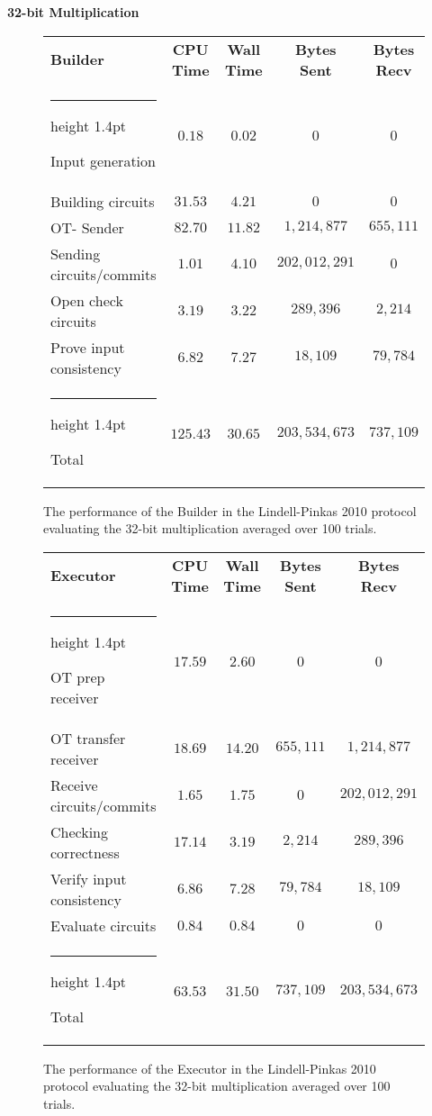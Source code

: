 \documentclass[11pt]{article} %
\makeatletter
\newcommand{\thickhline}{%
    \noalign {\ifnum 0=`}\fi \hrule height 1.4pt
    \futurelet \reserved@a \@xhline
}
\makeatother
\begin{document}
				\FloatBarrier
				\noindent \textbf{32-bit Multiplication}
				\begin{figure}[!ht]
					\begin{tabular}{| p{4.3cm} | c c c c |}
						\hline
						\textbf{Builder} & \textbf{CPU Time} & \textbf{Wall Time} & \textbf{Bytes Sent} & \textbf{Bytes Recv} \\
						\thickhline
						Input generation & $0.18$ & $0.02$ & $0$ & $0$ \\
						\hline
						Building circuits & $31.53$ & $4.21$ & $0$ & $0$ \\
						\hline
						OT- Sender & $82.70$ & $11.82$ & $1,214,877$ & $655,111$ \\
						\hline
						Sending circuits/commits & $1.01$ & $4.10$ & $202,012,291$ & $0$ \\
						\hline
						Open check circuits & $3.19$ & $3.22$ & $289,396$ & $2,214$ \\
						\hline
						Prove input consistency & $6.82$ & $7.27$ & $18,109$ & $79,784$ \\
						\thickhline
						Total & $125.43$ & $30.65$ & $203,534,673$ & $737,109$ \\
						\hline
					\end{tabular}

					\caption{The performance of the Builder in the Lindell-Pinkas 2010 protocol evaluating the 32-bit multiplication averaged over 100 trials. \label{table:LP_2010_Mul_Builder}}
				\end{figure}
				
				\begin{figure}[!ht]
					\begin{tabular}{| p{4.3cm} | c c c c |}
						\hline
						\textbf{Executor} & \textbf{CPU Time} & \textbf{Wall Time} & \textbf{Bytes Sent} & \textbf{Bytes Recv} \\
						\thickhline
						OT prep receiver & $17.59$ & $2.60$ & $0$ & $0$ \\
						\hline
						OT transfer receiver & $18.69$ & $14.20$ & $655,111$ & $1,214,877$ \\
						\hline
						Receive circuits/commits & $1.65$ & $1.75$ & $0$ & $202,012,291$ \\
						\hline
						Checking correctness & $17.14$ & $3.19$ & $2,214$ & $289,396$ \\
						\hline
						Verify input consistency & $6.86$ & $7.28$ & $79,784$ & $18,109$ \\
						\hline
						Evaluate circuits & $0.84$ & $0.84$ & $0$ & $0$ \\
						\thickhline
						Total & $63.53$ & $31.50$ & $737,109$ & $203,534,673$ \\
						\hline
					\end{tabular}
					\caption{The performance of the Executor in the Lindell-Pinkas 2010 protocol evaluating the 32-bit multiplication averaged over 100 trials. \label{table:LP_2010_Mul_Executor}}
				\end{figure}
				\FloatBarrier
\end{document}
